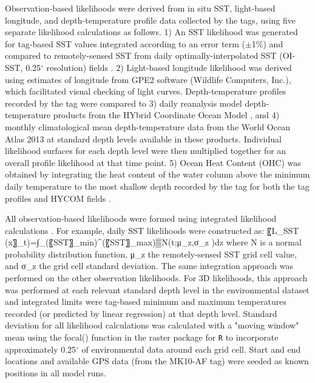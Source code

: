Observation-based likelihoods were derived from in situ SST, light-based longitude, and depth-temperature profile data collected by the tags, using five separate likelihood calculations as follows. 1) An SST likelihood was generated for tag-based SST values integrated according to an error term ($\pm$1\%) and compared to remotely-sensed SST from daily optimally-interpolated SST (OI-SST, 0.25$^{\circ}$ resolution) fields \citep{Reynolds2007, Banzon2016}. 2) Light-based longitude likelihood was derived using estimates of longitude from GPE2 software (Wildlife Computers, Inc.), which facilitated visual checking of light curves. Depth-temperature profiles recorded by the tag were compared to 3) daily reanalysis model depth-temperature products from the HYbrid Coordinate Ocean Model \citep[HYCOM, 0.08$^{\circ}$ resolution; ][]{Bleck2002, Chassignet2007}, and 4) monthly climatological mean depth-temperature data from the World Ocean Atlas 2013 \citep[0.25$^{\circ}$ resolution; ][]{Locarnini2013} at standard depth levels available in these products. Individual likelihood surfaces for each depth level were then multiplied together for an overall profile likelihood at that time point. 5) Ocean Heat Content (OHC) was obtained by integrating the heat content of the water column above the minimum daily temperature to the most shallow depth recorded by the tag for both the tag profiles and HYCOM fields \citep{Luo2015}. 

All observation-based likelihoods were formed using integrated likelihood calculations \citep{LeBris2013a}. For example, daily SST likelihoods were constructed as:
〖L_SST (x〗_t)=∫_(〖SST〗_min)^(〖SST〗_max)▒N(t;μ_z,σ_z )dz
where N is a normal probability distribution function, μ_z the remotely-sensed SST grid cell value, and σ_z the grid cell standard deviation. The same integration approach was performed on the other observation likelihoods. For 3D likelihoods, this approach was performed at each relevant standard depth level in the environmental dataset and integrated limits were tag-based minimum and maximum temperatures recorded (or predicted by linear regression) at that depth level. Standard deviation for all likelihood calculations was calculated with a "moving window" mean using the focal() function in the raster package \citep{Hijmans2016} for \texttt{R} to incorporate approximately 0.25$^{\circ}$ of environmental data around each grid cell. Start and end locations and available GPS data (from the MK10-AF tag) were seeded as known positions in all model runs.

